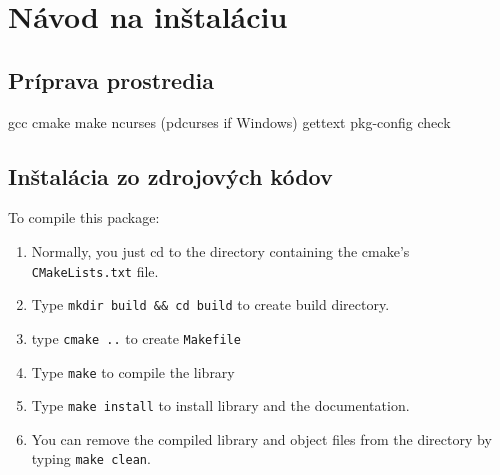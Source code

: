 
\chapter{Návod na inštaláciu}\label{app:installation}


\section{Príprava prostredia}



gcc
cmake
make
ncurses (pdcurses if Windows)
gettext
pkg-config
check



\section{Inštalácia zo zdrojových kódov}

To compile this package:

\begin{enumerate}
    \item Normally, you just cd to the directory containing the cmake's \texttt{CMakeLists.txt} file.

    \item Type \texttt{mkdir build \&\& cd build} to create build directory.

    \item type \texttt{cmake ..} to create \texttt{Makefile}

    \item Type \texttt{make} to compile the library

    \item Type \texttt{make install} to install library and the documentation.

    \item You can remove the compiled library and object files from the directory by typing \texttt{make clean}.
\end{enumerate}
